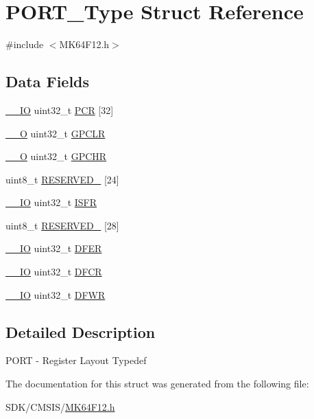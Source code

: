 \hypertarget{struct_p_o_r_t___type}{}\section{P\+O\+R\+T\+\_\+\+Type Struct Reference}
\label{struct_p_o_r_t___type}


{\ttfamily \#include $<$M\+K64\+F12.\+h$>$}

\subsection*{Data Fields}
\begin{DoxyCompactItemize}
\item 
\mbox{\hyperlink{core__cm4_8h_aec43007d9998a0a0e01faede4133d6be}{\+\_\+\+\_\+\+IO}} uint32\+\_\+t \mbox{\hyperlink{group___v_r_e_f___peripheral___access___layer_ga25bc9eea888d201d852deb4819850bb2}{P\+CR}} \mbox{[}32\mbox{]}
\item 
\mbox{\hyperlink{core__cm4_8h_a7e25d9380f9ef903923964322e71f2f6}{\+\_\+\+\_\+O}} uint32\+\_\+t \mbox{\hyperlink{group___v_r_e_f___peripheral___access___layer_ga7ca65d71461aa5e76eb2266ab7ccd0cf}{G\+P\+C\+LR}}
\item 
\mbox{\hyperlink{core__cm4_8h_a7e25d9380f9ef903923964322e71f2f6}{\+\_\+\+\_\+O}} uint32\+\_\+t \mbox{\hyperlink{group___v_r_e_f___peripheral___access___layer_gabc885669f9579a0514a37a62fc070ec7}{G\+P\+C\+HR}}
\item 
uint8\+\_\+t \mbox{\hyperlink{group___v_r_e_f___peripheral___access___layer_ga33a1c574e559dc57bb2fc28166bf6341}{R\+E\+S\+E\+R\+V\+E\+D\+\_}} \mbox{[}24\mbox{]}
\item 
\mbox{\hyperlink{core__cm4_8h_aec43007d9998a0a0e01faede4133d6be}{\+\_\+\+\_\+\+IO}} uint32\+\_\+t \mbox{\hyperlink{group___v_r_e_f___peripheral___access___layer_ga810f6911c38333115775f924be784050}{I\+S\+FR}}
\item 
uint8\+\_\+t \mbox{\hyperlink{group___v_r_e_f___peripheral___access___layer_ga110c7cdc6ff066e67353a119359731f2}{R\+E\+S\+E\+R\+V\+E\+D\+\_}} \mbox{[}28\mbox{]}
\item 
\mbox{\hyperlink{core__cm4_8h_aec43007d9998a0a0e01faede4133d6be}{\+\_\+\+\_\+\+IO}} uint32\+\_\+t \mbox{\hyperlink{group___v_r_e_f___peripheral___access___layer_ga08715ad30e568d84770805b6bdbc1cfb}{D\+F\+ER}}
\item 
\mbox{\hyperlink{core__cm4_8h_aec43007d9998a0a0e01faede4133d6be}{\+\_\+\+\_\+\+IO}} uint32\+\_\+t \mbox{\hyperlink{group___v_r_e_f___peripheral___access___layer_gad85d97f511fdb6626888603d5c970d3d}{D\+F\+CR}}
\item 
\mbox{\hyperlink{core__cm4_8h_aec43007d9998a0a0e01faede4133d6be}{\+\_\+\+\_\+\+IO}} uint32\+\_\+t \mbox{\hyperlink{group___v_r_e_f___peripheral___access___layer_gac0bb591e49f732d8010df56312388c74}{D\+F\+WR}}
\end{DoxyCompactItemize}


\subsection{Detailed Description}
P\+O\+RT -\/ Register Layout Typedef 

The documentation for this struct was generated from the following file\+:\begin{DoxyCompactItemize}
\item 
S\+D\+K/\+C\+M\+S\+I\+S/\mbox{\hyperlink{_m_k64_f12_8h}{M\+K64\+F12.\+h}}\end{DoxyCompactItemize}
